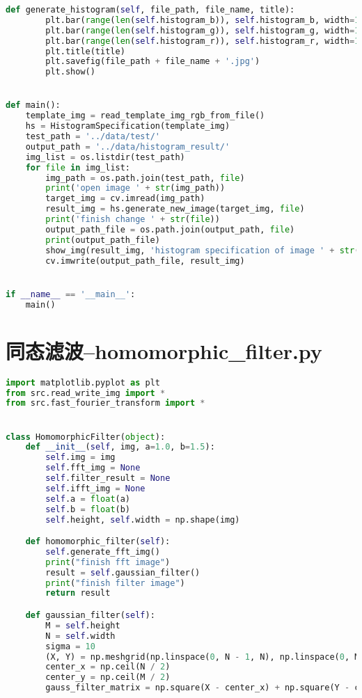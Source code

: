 \documentclass{hitreport}
\begin{document}
\begin{appendices}
\begin{lstlisting}[language=python]
    def generate_histogram(self, file_path, file_name, title):
        plt.bar(range(len(self.histogram_b)), self.histogram_b, width=1, color='b')
        plt.bar(range(len(self.histogram_g)), self.histogram_g, width=1, color='g')
        plt.bar(range(len(self.histogram_r)), self.histogram_r, width=1, color='r')
        plt.title(title)
        plt.savefig(file_path + file_name + '.jpg')
        plt.show()


def main():
    template_img = read_template_img_rgb_from_file()
    hs = HistogramSpecification(template_img)
    test_path = '../data/test/'
    output_path = '../data/histogram_result/'
    img_list = os.listdir(test_path)
    for file in img_list:
        img_path = os.path.join(test_path, file)
        print('open image ' + str(img_path))
        target_img = cv.imread(img_path)
        result_img = hs.generate_new_image(target_img, file)
        print('finish change ' + str(file))
        output_path_file = os.path.join(output_path, file)
        print(output_path_file)
        show_img(result_img, 'histogram specification of image ' + str(file))
        cv.imwrite(output_path_file, result_img)


if __name__ == '__main__':
    main()

\end{lstlisting}

\section{同态滤波--homomorphic\_filter.py}\label{app:homo}
\begin{lstlisting}[language=python]
import matplotlib.pyplot as plt
from src.read_write_img import *
from src.fast_fourier_transform import *


class HomomorphicFilter(object):
    def __init__(self, img, a=1.0, b=1.5):
        self.img = img
        self.fft_img = None
        self.filter_result = None
        self.ifft_img = None
        self.a = float(a)
        self.b = float(b)
        self.height, self.width = np.shape(img)

    def homomorphic_filter(self):
        self.generate_fft_img()
        print("finish fft image")
        result = self.gaussian_filter()
        print("finish filter image")
        return result

    def gaussian_filter(self):
        M = self.height
        N = self.width
        sigma = 10
        (X, Y) = np.meshgrid(np.linspace(0, N - 1, N), np.linspace(0, M - 1, M))
        center_x = np.ceil(N / 2)
        center_y = np.ceil(M / 2)
        gauss_filter_matrix = np.square(X - center_x) + np.square(Y - center_y)


\end{lstlisting}
\end{appendices}
\end{document}
